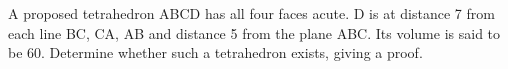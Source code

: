 A proposed tetrahedron ABCD has all four faces acute. D is at distance 7 from each line BC, CA, AB and distance 5 from the plane ABC. Its volume is said to be 60. Determine whether such a tetrahedron exists, giving a proof.

